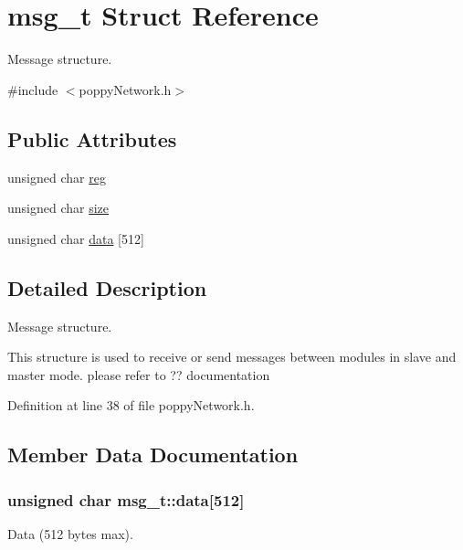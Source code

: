\hypertarget{structmsg__t}{\section{msg\-\_\-t \-Struct \-Reference}
\label{structmsg__t}
}


\-Message structure.  




{\ttfamily \#include $<$poppy\-Network.\-h$>$}

\subsection*{\-Public \-Attributes}
\begin{DoxyCompactItemize}
\item 
unsigned char \hyperlink{structmsg__t_a0aef01fbaf575c639d82d5beee92c421}{reg}
\item 
unsigned char \hyperlink{structmsg__t_a3736f2ca203e665223b225ca07def9b5}{size}
\item 
unsigned char \hyperlink{structmsg__t_ab11ea949abe5142d3e5c5911cf971860}{data} \mbox{[}512\mbox{]}
\end{DoxyCompactItemize}


\subsection{\-Detailed \-Description}
\-Message structure. 

\-This structure is used to receive or send messages between modules in slave and master mode. please refer to ?? documentation 

\-Definition at line 38 of file poppy\-Network.\-h.



\subsection{\-Member \-Data \-Documentation}
\hypertarget{structmsg__t_ab11ea949abe5142d3e5c5911cf971860}{
\subsubsection[{data}]{\setlength{\rightskip}{0pt plus 5cm}unsigned char {\bf msg\-\_\-t\-::data}\mbox{[}512\mbox{]}}}\label{structmsg__t_ab11ea949abe5142d3e5c5911cf971860}
\-Data (512 bytes max). 

